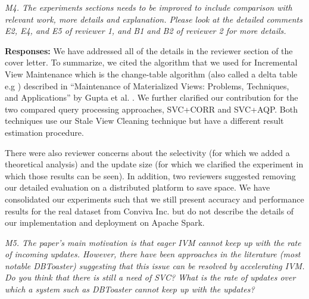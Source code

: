 \vspace{1em}
\emph{M4. The experiments sections needs to be improved to include comparison with relevant work, more details and explanation. Please look at the detailed comments E2, E4, and E5 of reviewer 1, and B1 and B2 of reviewer 2 for more details. }

\vspace{.25em}

{\bf Responses:} We have addressed all of the details in the reviewer section of the cover letter. To summarize, we cited the algorithm that we used for Incremental View Maintenance which is the change-table algorithm (also called a delta table e.g \cite{DBLP:journals/vldb/KochAKNNLS14}) described in “Maintenance of Materialized Views: Problems, Techniques, and Applications” by Gupta et al. \cite{gupta1995maintenance, gupta2006incremental}. 
We further clarified our contribution for the two compared query processing approaches, SVC+CORR and SVC+AQP. Both techniques use our Stale View Cleaning technique but have a different result estimation procedure. 

There were also reviewer concerns about the selectivity (for which we added a theoretical analysis) and the update size (for which we clarified the experiment in which those results can be seen).
In addition, two reviewers suggested removing our detailed evaluation on a distributed platform to save space. We have consolidated our experiments such that we still present accuracy and performance results for the real dataset from Conviva Inc. but do not describe the details of our implementation and deployment on Apache Spark.

\vspace{1em}
\emph{M5. The paper's main motivation is that eager IVM cannot keep up with the rate of incoming updates. However, there have been approaches in the literature (most notable DBToaster) suggesting that this issue can be resolved by accelerating IVM. Do you think that there is still a need of SVC? What is the rate of updates over which a system such as DBToaster cannot keep up with the updates?}

\vspace{.25em}

